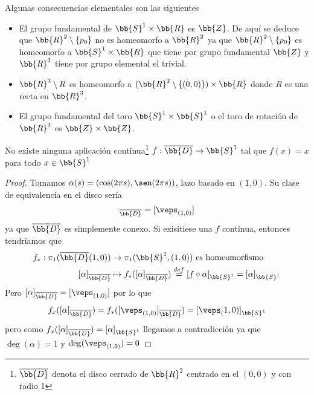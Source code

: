 \begin{observacion}
    Algunas consecuencias elementales son las siguientes
    \begin{itemize}
        \item El grupo fundamental de $\bb{S}^1\times \bb{R}$ es $\bb{Z}$. De aquí se deduce que $\bb{R}^2 \setminus \{p_0\}$ no es homeomorfo a $\bb{R}^2$ ya que $\bb{R}^2 \setminus \{p_0\}$ es homeomorfo a $\bb{S}^1\times \bb{R}$ que tiene por grupo fundamental $\bb{Z}$ y $\bb{R}^2$ tiene por grupo elemental el trivial.
        
        \item $\bb{R}^3\setminus R$ es homeomorfo a $(\bb{R}^2 \setminus \{(0,0)\}) \times \bb{R}$ donde $R$ es una recta en $\bb{R}^3$.
        
        \item El grupo fundamental del toro $\bb{S}^1 \times \bb{S}^1$ o el toro de rotación de $\bb{R}^3$ es $\bb{Z}\times \bb{Z}$.
    \end{itemize}
\end{observacion}

\begin{prop}\label{prop1-12}
    No existe ninguna aplicación continua\footnote{$\overline{\bb{D}}$ denota el disco cerrado de $\bb{R}^2$ centrado en el $(0,0)$ y con radio 1} $f : \overline{\bb{D}} \to \bb{S}^1$ tal que $f(x) = x$ para todo $x\in \bb{S}^1$

    \begin{proof}
        Tomamos $\alpha (s) = (\cos(2\pi s), \sen(2\pi s))$, lazo basado en $(1,0)$. Su clase de equivalencia en el disco sería 
        \begin{gather*}
            [\alpha]_{\overline{\bb{D}}} = [\veps_{(1,0)}]
        \end{gather*}
        ya que $\overline{\bb{D}}$ es simplemente conexo. Si exisitiese una $f$ continua, entonces tendríamos que
        \begin{align*}
            f_*:\pi_1(\overline{\bb{D}}(1,0)) & \to \pi_1(\bb{S}^1, (1,0))\text{ es homeomorfismo}\\
            [\alpha]_{\overline{\bb{D}}} & \mapsto f_*([\alpha]_{\overline{\bb{D}}}) \overset{def}{=}[f\circ \alpha]_{\bb{S}^1} = [\alpha]_{\bb{S}^1}
        \end{align*}
        Pero $[\alpha]_{\overline{\bb{D}}} = [\veps_{(1,0)}]$ por lo que 
        \begin{gather*}
            f_x([\alpha]_{\overline{\bb{D}}}) = f_*([\veps_{(1,0)}]_{\overline{\bb{D}}}) = [\veps_(1,0)]_{\bb{S}^1}
        \end{gather*}
        pero como $f_x([\alpha]_{\overline{\bb{D}}}) = [\alpha]_{\bb{S}^1}$ llegamos a contradicción ya que $\deg(\alpha) = 1$ y $\deg(\veps_{(1,0)}) = 0$
    \end{proof}
\end{prop}

